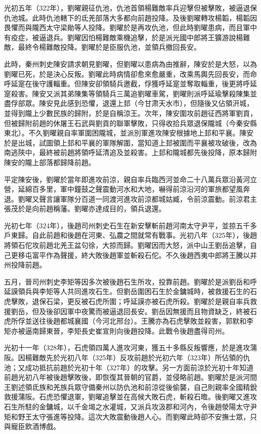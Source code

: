 光初五年（322年），劉曜親征仇池，仇池首領楊難敵率兵迎擊但被擊敗，被逼退保仇池城。此時仇池轄下的氐羌部落大多都向前趙投降。及後劉曜轉攻楊韜，楊韜因畏懼而與隴西太守梁勛等人投降。劉曜於是再攻仇池，但此時劉曜患病，而且軍中有疫症，被逼退兵。劉曜因怕楊難敵乘機追擊，於是派光國中郎將王獷游說楊難敵，最終令楊難敵投降。劉曜於是臣服仇池，並領兵撤回長安。

此時，秦州刺史陳安請求朝見劉曜，但劉曜以患病為由推辭，陳安於是大怒，以為劉曜已死，於是決心反叛。劉曜此時病情卻愈來愈嚴重，改乘馬輿先回長安，而命呼延寔在後守護輜重。但陳安卻領騎兵邀截，俘獲呼延寔並奪取輜重，後更將呼延寔殺害。陳安又派其弟陳集等領騎兵三萬追劉曜車駕，劉曜則派呼延瑜擊殺陳集並盡俘部眾。陳安見此感到恐懼，退還上邽（今甘肃天水市），但隨後又佔領汧城，並得到隴上少數民族的歸附，於是自稱涼王。次年，陳安圍攻前趙征西將軍劉貢，但被歸附前趙的休屠王石武與劉貢的聯軍擊敗，只得收拾兵眾退保隴城（今秦安縣東北）。不久劉曜親自率軍圍困隴城，並派別軍進攻陳安根據地上邽和平襄。陳安於是出城，試圖領上邽和平襄的軍隊解圍，當知道上邽被圍而平襄被攻破後，改為南逃陝中，最終被前趙將領呼延清追及並殺害。上邽和隴城都先後投降，原本歸附陳安的隴上部落都歸降前趙。

平定陳安後，劉曜於當年即進攻前涼，親自率兵臨西河並命二十八萬兵眾沿黃河立營，延綿百多里，軍中鐘鼓之聲震動河水和大地，嚇得前涼沿河的軍旅都望風奔退。劉曜又聲言讓軍隊分百道一同渡河進攻前涼都城姑臧，令前涼震動。前涼君主張茂於是向前趙稱藩。劉曜亦達成目的，領兵退還。

光初七年（324年），後趙司州刺史石生在新安擊斬前趙河南太守尹平，並掠五千多戶東歸。自此前趙和後趙在河東、弘農之間就常有戰事。光初八年（325年），後趙將領石佗攻前趙北羌王盆句徐，大掠而歸。劉曜因而大怒，派中山王劉岳追擊，自己更移屯富平作為聲援，終大敗後趙軍並斬殺石佗。不久後趙西夷中郎將王騰以并州投降前趙。

五月，晉司州刺史李矩等因多次被後趙石生所攻，投靠前趙。劉曜於是派劉岳和呼延謨領兵與李矩等人共同進攻石生。但劉岳圍困石生於金鏞城時，被救援石生的石虎擊敗，退保石梁，更反被石虎所圍；呼延謨亦被石虎所殺。劉曜於是親自率兵救援劉岳，但及後卻因軍中夜驚而被逼退回長安。劉岳因無援而且物資缺乏，終被石虎所俘並送往後趙都城襄國（今河北邢台）。王騰亦為石虎擊敗並殺害，郭默和李矩亦被逼南歸東晉，李矩長史崔宣則向後趙投降。此戰令後趙盡得司州。

光初十一年（328年），石虎領四萬人進攻河東，獲五十多縣反叛響應，於是進攻蒲阪。因楊難敵先於光初八年（325年）反攻前趙於光初六年（323年）所佔領的仇池；又成功抵抗前趙於光初十年（327年）的攻擊。另一方面前涼於光初十年知道前趙光初八年被後趙擊敗後，即恢復其晉朝的官爵，並侵略前趙。劉曜於是派河間王劉述領氐族和羌族兵眾守備秦州以防仇池和前涼從後偷襲，自己則親率全國精銳救援蒲阪。石虎恐懼退軍，劉曜追擊並在高候大敗石虎，斬殺石曕。後劉曜又進攻石生所駐的金鏞城，以千金堨之水灌城，又派兵攻汲郡和河內，令後趙滎陽太守尹矩和野王太守張進等投降。這次大敗震動後趙人心。而劉曜此時卻不安撫士眾，只與寵臣飲酒博戲。

